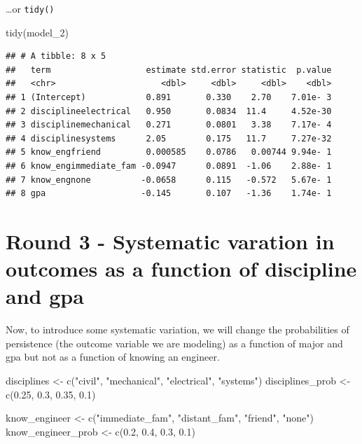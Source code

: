 \documentclass[
]{book}
\newenvironment{Shaded}{\begin{snugshade}}{\end{snugshade}}
\newcommand{\FloatTok}[1]{\textcolor[rgb]{0.00,0.00,0.81}{#1}}
\newcommand{\FunctionTok}[1]{\textcolor[rgb]{0.00,0.00,0.00}{#1}}
\newcommand{\NormalTok}[1]{#1}
\newcommand{\OtherTok}[1]{\textcolor[rgb]{0.56,0.35,0.01}{#1}}
\newcommand{\StringTok}[1]{\textcolor[rgb]{0.31,0.60,0.02}{#1}}
\begin{document}
\ldots or \texttt{tidy()}

\begin{Shaded}
\begin{Highlighting}[]
\FunctionTok{tidy}\NormalTok{(model\_2)}
\end{Highlighting}
\end{Shaded}

\begin{verbatim}
## # A tibble: 8 x 5
##   term                   estimate std.error statistic  p.value
##   <chr>                     <dbl>     <dbl>     <dbl>    <dbl>
## 1 (Intercept)            0.891       0.330    2.70    7.01e- 3
## 2 disciplineelectrical   0.950       0.0834  11.4     4.52e-30
## 3 disciplinemechanical   0.271       0.0801   3.38    7.17e- 4
## 4 disciplinesystems      2.05        0.175   11.7     7.27e-32
## 5 know_engfriend         0.000585    0.0786   0.00744 9.94e- 1
## 6 know_engimmediate_fam -0.0947      0.0891  -1.06    2.88e- 1
## 7 know_engnone          -0.0658      0.115   -0.572   5.67e- 1
## 8 gpa                   -0.145       0.107   -1.36    1.74e- 1
\end{verbatim}

\hypertarget{round-3---systematic-varation-in-outcomes-as-a-function-of-discipline-and-gpa}{%
\section{Round 3 - Systematic varation in outcomes as a function of discipline and gpa}\label{round-3---systematic-varation-in-outcomes-as-a-function-of-discipline-and-gpa}}

Now, to introduce some systematic variation, we will change the probabilities of persistence (the outcome variable we are modeling) as a function of major and gpa but not as a function of knowing an engineer.

\begin{Shaded}
\begin{Highlighting}[]
\NormalTok{disciplines }\OtherTok{\textless{}{-}} \FunctionTok{c}\NormalTok{(}\StringTok{"civil"}\NormalTok{, }\StringTok{"mechanical"}\NormalTok{, }\StringTok{"electrical"}\NormalTok{, }\StringTok{"systems"}\NormalTok{)}
\NormalTok{disciplines\_prob }\OtherTok{\textless{}{-}} \FunctionTok{c}\NormalTok{(}\FloatTok{0.25}\NormalTok{, }\FloatTok{0.3}\NormalTok{, }\FloatTok{0.35}\NormalTok{, }\FloatTok{0.1}\NormalTok{)}

\NormalTok{know\_engineer }\OtherTok{\textless{}{-}} \FunctionTok{c}\NormalTok{(}\StringTok{"immediate\_fam"}\NormalTok{, }\StringTok{"distant\_fam"}\NormalTok{, }\StringTok{"friend"}\NormalTok{, }\StringTok{"none"}\NormalTok{)}
\NormalTok{know\_engineer\_prob }\OtherTok{\textless{}{-}} \FunctionTok{c}\NormalTok{(}\FloatTok{0.2}\NormalTok{, }\FloatTok{0.4}\NormalTok{, }\FloatTok{0.3}\NormalTok{, }\FloatTok{0.1}\NormalTok{)}
\end{Highlighting}
\end{Shaded}
\end{document}
